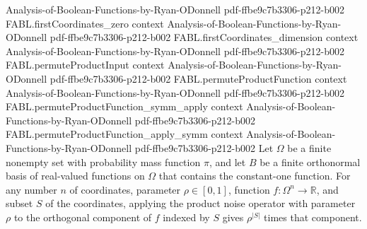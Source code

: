 \begin{theorem}
  {Analysis-of-Boolean-Functions-by-Ryan-ODonnell}
  {pdf-ffbe9c7b3306-p212-b002}
\proofstep
  {FABL.firstCoordinates_zero}
  {context}
  {Analysis-of-Boolean-Functions-by-Ryan-ODonnell}
  {pdf-ffbe9c7b3306-p212-b002}
\proofstep
  {FABL.firstCoordinates_dimension}
  {context}
  {Analysis-of-Boolean-Functions-by-Ryan-ODonnell}
  {pdf-ffbe9c7b3306-p212-b002}
\proofstep
  {FABL.permuteProductInput}
  {context}
  {Analysis-of-Boolean-Functions-by-Ryan-ODonnell}
  {pdf-ffbe9c7b3306-p212-b002}
\proofstep
  {FABL.permuteProductFunction}
  {context}
  {Analysis-of-Boolean-Functions-by-Ryan-ODonnell}
  {pdf-ffbe9c7b3306-p212-b002}
\proofstep
  {FABL.permuteProductFunction_symm_apply}
  {context}
  {Analysis-of-Boolean-Functions-by-Ryan-ODonnell}
  {pdf-ffbe9c7b3306-p212-b002}
\proofstep
  {FABL.permuteProductFunction_apply_symm}
  {context}
  {Analysis-of-Boolean-Functions-by-Ryan-ODonnell}
  {pdf-ffbe9c7b3306-p212-b002}
Let $\Omega$ be a finite nonempty set with probability mass function $\pi$, and let $B$
be a finite orthonormal basis of real-valued functions on $\Omega$ that contains the
constant-one function. For any number $n$ of coordinates, parameter $\rho\in[0,1]$,
function $f\colon\Omega^n\to\mathbb R$, and subset $S$ of the coordinates, applying the
product noise operator with parameter $\rho$ to the orthogonal component of $f$ indexed
by $S$ gives $\rho^{|S|}$ times that component.
\end{theorem}

